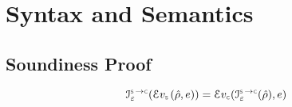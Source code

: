 
\newtheorem{lemmax}{}
\newtheorem{temax}{}
\newtheorem{cormax}{}


\section{\jsil Syntax and Semantics}

\subsection{Soundiness Proof}

\begin{lemma}\label{symb:eval:expr}
$$
\interpret{\symbconc}{\senv}(\evalexpr{\symbolic}(\sstore, \jsilexpr)) = \evalexpr{\concrete}(\interpret{\symbconc}{\senv}(\sstore), \jsilexpr)
$$
\end{lemma}
